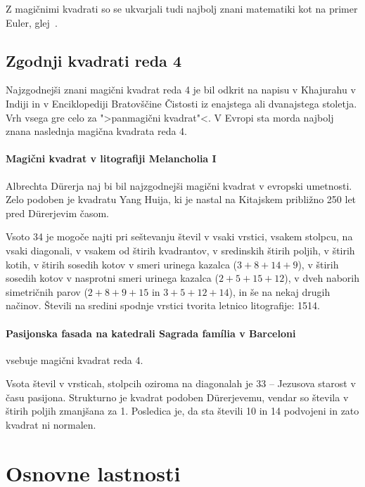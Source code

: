 \documentclass[a4paper,12pt]{article}
\begin{document}
Z magičnimi kvadrati so se ukvarjali tudi najbolj znani matematiki kot na
primer Euler, glej~\cite{euler}.


\subsection{Zgodnji kvadrati reda 4}

Najzgodnejši znani magični kvadrat reda 4 je bil odkrit na napisu
v Khajurahu v Indiji in v Enciklopediji Bratovščine Čistosti iz enajstega
ali dvanajstega stoletja. Vrh vsega gre celo za ">panmagični kvadrat"<.
V Evropi sta morda najbolj znana naslednja magična kvadrata reda 4.

\paragraph{Magični kvadrat v litografiji Melancholia I}
Albrechta Dürerja naj bi bil najzgodnejši magični kvadrat
v evropski umetnosti. Zelo podoben je kvadratu Yang Huija, ki je nastal na Kitajskem
približno 250 let pred Dürerjevim časom.

Vsoto 34 je mogoče najti pri seštevanju števil v vsaki vrstici, vsakem stolpcu,
na vsaki diagonali, v vsakem od štirih kvadrantov, v sredinskih štirih poljih,
v štirih kotih, v štirih sosedih kotov v smeri urinega kazalca (\(3+8+14+9\)), v
štirih sosedih kotov v nasprotni smeri urinega kazalca (\(2+5+15+12\)), v dveh naborih
simetričnih parov (\(2+8+9+15\) in \(3+5+12+14\)), in še na nekaj drugih načinov.
Števili na sredini spodnje vrstici tvorita letnico litografije: 1514.

\paragraph{Pasijonska fasada na katedrali Sagrada família v Barceloni}
vsebuje magični kvadrat reda 4.

Vsota števil v vrsticah, stolpcih oziroma na diagonalah je 33 -- Jezusova starost
v času pasijona. Strukturno je kvadrat podoben Dürerjevemu, vendar so števila
v štirih poljih zmanjšana za 1. Posledica je, da sta števili 10 in 14 podvojeni
in zato kvadrat ni normalen.


\section{Osnovne lastnosti}
\end{document}
